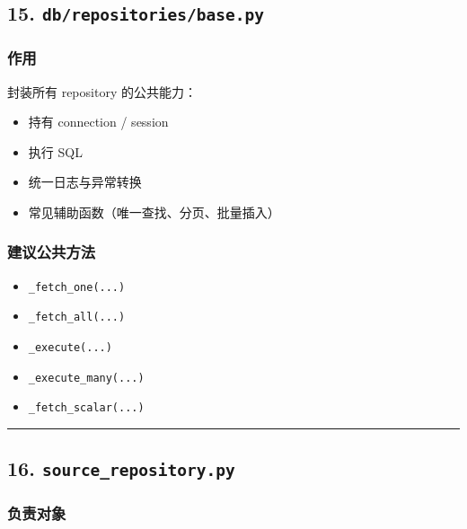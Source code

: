 \documentclass[UTF8]{ctexart}
\providecommand{\tightlist}{%
  \setlength{\itemsep}{0pt}\setlength{\parskip}{0pt}}
\begin{document}
\hypertarget{dbrepositoriesbase.py}{%
\subsection{\texorpdfstring{15.
\texttt{db/repositories/base.py}}{15. db/repositories/base.py}}\label{dbrepositoriesbase.py}}

\hypertarget{ux4f5cux7528-2}{%
\subsubsection{作用}\label{ux4f5cux7528-2}}

封装所有 repository 的公共能力：

\begin{itemize}
\tightlist
\item
  持有 connection / session
\item
  执行 SQL
\item
  统一日志与异常转换
\item
  常见辅助函数（唯一查找、分页、批量插入）
\end{itemize}

\hypertarget{ux5efaux8baeux516cux5171ux65b9ux6cd5}{%
\subsubsection{建议公共方法}\label{ux5efaux8baeux516cux5171ux65b9ux6cd5}}

\begin{itemize}
\tightlist
\item
  \texttt{\_fetch\_one(...)}
\item
  \texttt{\_fetch\_all(...)}
\item
  \texttt{\_execute(...)}
\item
  \texttt{\_execute\_many(...)}
\item
  \texttt{\_fetch\_scalar(...)}
\end{itemize}

\begin{center}\rule{0.5\linewidth}{0.5pt}\end{center}

\hypertarget{source_repository.py}{%
\subsection{\texorpdfstring{16.
\texttt{source\_repository.py}}{16. source\_repository.py}}\label{source_repository.py}}

\hypertarget{ux8d1fux8d23ux5bf9ux8c61}{%
\subsubsection{负责对象}\label{ux8d1fux8d23ux5bf9ux8c61}}
\end{document}
